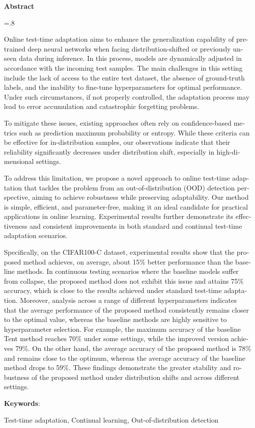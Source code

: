 

\begin{latin}
	
	\begin{center}
		\textbf{Abstract}
	\end{center}
	\baselineskip=.8\baselineskip
	
	Online test-time adaptation aims to enhance the generalization capability of pre-trained deep neural networks when facing distribution-shifted or previously unseen data during inference. In this process, models are dynamically adjusted in accordance with the incoming test samples. The main challenges in this setting include the lack of access to the entire test dataset, the absence of ground-truth labels, and the inability to fine-tune hyperparameters for optimal performance. Under such circumstances, if not properly controlled, the adaptation process may lead to error accumulation and catastrophic forgetting problems.
	
	To mitigate these issues, existing approaches often rely on confidence-based metrics such as prediction maximum probability or entropy. While these criteria can be effective for in-distribution samples, our observations indicate that their reliability significantly decreases under distribution shift, especially in high-dimensional settings.
	
	To address this limitation, we propose a novel approach to online test-time adaptation that tackles the problem from an out-of-distribution (OOD) detection perspective, aiming to achieve robustness while preserving adaptability. Our method is simple, efficient, and parameter-free, making it an ideal candidate for practical applications in online learning. Experimental results further demonstrate its effectiveness and consistent improvements in both standard and continual test-time adaptation scenarios.
	
	Specifically, on the CIFAR100-C dataset, experimental results show that the proposed method achieves, on average, about 15\% better performance than the baseline methods. In continuous testing scenarios where the baseline models suffer from collapse, the proposed method does not exhibit this issue and attains 75\% accuracy, which is close to the results achieved under standard test-time adaptation.
    Moreover, analysis across a range of different hyperparameters indicates that the average performance of the proposed method consistently remains closer to the optimal value, whereas the baseline methods are highly sensitive to hyperparameter selection. For example, the maximum accuracy of the baseline Tent method reaches 70\% under some settings, while the improved version achieves 79\%. On the other hand, the average accuracy of the proposed method is 78\% and remains close to the optimum, whereas the average accuracy of the baseline method drops to 59\%.
    These findings demonstrate the greater stability and robustness of the proposed method under distribution shifts and across different settings.

	\bigskip\noindent\textbf{Keywords}:
	
	Test-time adaptation, Continual learning, Out-of-distribution detection
	
\end{latin}
